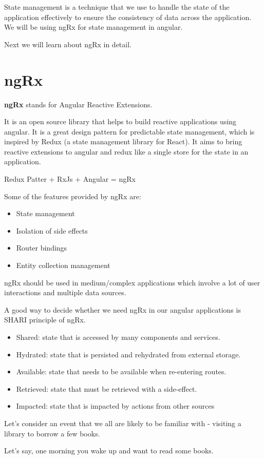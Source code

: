 \documentclass{report}
\begin{document}
State management is a technique that we use to handle the state of the application effectively to ensure the consistency of data across the application.
We will be using ngRx for state management in angular.

Next we will learn about ngRx in detail.
\section{ngRx}
\textbf{ngRx} stands for Angular Reactive Extensions.

It is an open source library that helps to build reactive applications using angular.
It is a great design pattern for predictable state management, which is inspired by Redux (a state management library for React).
It aims to bring reactive extensions to angular and redux like a single store for the state in an application.

Redux Patter + RxJs + Angular = ngRx

Some of the features provided by ngRx are:
\begin{itemize}
	\item{State management}
	\item{Isolation of side effects}
	\item{Router bindings}
	\item{Entity collection management}
\end{itemize}
ngRx should be used in medium/complex applications which involve a lot of user interactions and multiple data sources.

A good way to decide whether we need ngRx in our angular applications is SHARI principle of ngRx.
\begin{itemize}
	\item{Shared: state that is accessed by many components and services.}
	\item{Hydrated: state that is persisted and rehydrated from external storage.}
	\item{Available: state that needs to be available when re-entering routes.}
	\item{Retrieved: state that must be retrieved with a side-effect.}
	\item{Impacted: state that is impacted by actions from other sources}
\end{itemize}

Let's consider an event that we all are likely to be familiar with - visiting a library to borrow a few books.

Let's say, one morning you wake up and want to read some books.
\end{document}
